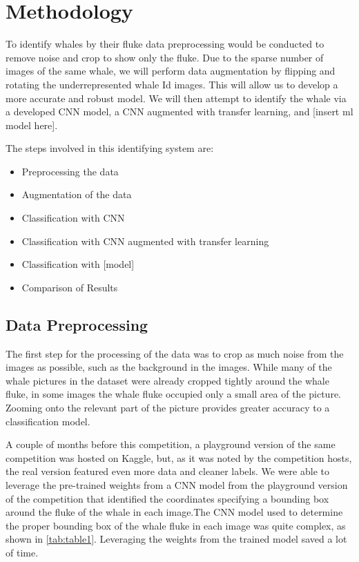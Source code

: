 \documentclass[paper=a4, fontsize=11pt]{scrartcl}
\numberwithin{equation}{section}		%
\numberwithin{table}{section}				%
\begin{document}
\section{Methodology}\label{sec: meth}



To identify whales by their fluke data preprocessing would be conducted to remove noise and crop to show only the fluke. Due to the sparse number of images of the same whale, we will perform data augmentation by flipping and rotating the underrepresented whale Id images. This will allow us to develop a more accurate and robust model. We will then attempt to identify the whale via a developed CNN model, a CNN augmented with transfer learning, and [insert ml model here].

The steps involved in this identifying system are:
\begin{itemize}
    \item Preprocessing the data
    \item Augmentation of the data
    \item Classification with CNN
    \item Classification with CNN augmented with transfer learning
    \item Classification with [model]
    \item Comparison of Results
\end{itemize}

\subsection{Data Preprocessing}\label{subsec:Preprocessing}

The first step for the processing of the data was to crop as much noise from the images as possible, such as the background in the images. While many of the whale pictures in the dataset were already cropped tightly around the whale fluke, in some images the whale fluke occupied only a small area of the picture. Zooming onto the relevant part of the picture provides greater accuracy to a classification model. 

A couple of months before this competition, a playground version of the same competition was hosted on Kaggle, but, as it was noted by the competition hosts, the real version featured even more data and cleaner labels. We were able to leverage the pre-trained weights from a CNN model from the playground version of the competition that identified the coordinates specifying a bounding box around the fluke of the whale in each image.The CNN model used to determine the proper bounding box of the whale fluke in each image was quite complex, as shown in \autoref{tab:table1}. Leveraging the weights from the trained model saved a lot of time.
\end{document}
